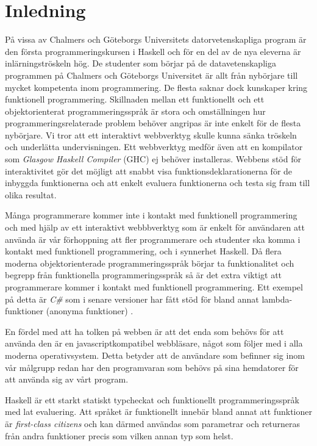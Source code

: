 \section{Inledning}
På vissa av Chalmers och Göteborgs Universitets datorvetenskapliga program är den första programmeringskursen i Haskell \citep{haskell98} och för en del av de nya eleverna är inlärningströskeln hög. De studenter som börjar på de datavetenskapliga programmen på Chalmers och Göteborgs Universitet är allt från nybörjare till mycket kompetenta inom programmering. De flesta saknar dock kunskaper kring funktionell programmering. Skillnaden mellan ett funktionellt och ett objektorienterat programmeringsspråk är stora och omställningen hur programmeringsrelaterade problem behöver angripas  är inte enkelt för de flesta nybörjare. Vi tror att ett interaktivt webbverktyg skulle kunna sänka tröskeln och underlätta undervisningen. Ett webbverktyg medför även att en kompilator som \emph{Glasgow Haskell Compiler} (GHC) \citep{ghc} ej behöver installeras. Webbens stöd för interaktivitet gör det möjligt att snabbt visa funktionsdeklarationerna för de inbyggda funktionerna och att enkelt evaluera funktionerna och testa sig fram till olika resultat.

Många programmerare kommer inte i kontakt med funktionell programmering  och med hjälp av ett interaktivt webbbverktyg som är enkelt för användaren att använda är vår förhoppning att fler programmerare och studenter ska komma i kontakt med funktionell programmering, och i synnerhet Haskell. Då flera moderna objektorienterade programmeringsspråk börjar ta funktionalitet och begrepp från funktionella programmeringsspråk så är det extra viktigt att programmerare kommer i kontakt med funktionell programmering. Ett exempel på detta är \emph{C\#} som i senare versioner har fått stöd för bland annat lambda-funktioner (anonyma funktioner) \citep{csharp}. 

En fördel med att ha tolken på webben är att det enda som behövs för att använda den är en javascriptkompatibel webbläsare, något som följer med i alla moderna operativsystem. Detta betyder att de användare som befinner sig inom vår målgrupp redan har den programvaran som behövs på sina hemdatorer för att använda sig av vårt program.  

Haskell är ett starkt statiskt typcheckat och funktionellt programmeringsspråk med lat evaluering. %
Att språket är funktionellt innebär bland annat att funktioner är \emph{first-class citizens} och kan därmed användas som parametrar och returneras från andra funktioner precis som vilken annan typ som helst.

